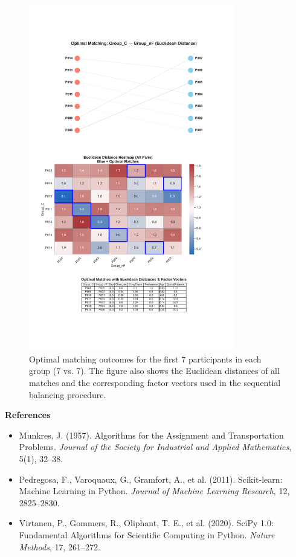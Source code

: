 \documentclass[]{imag-ms-template}
\begin{document}
\begin{figure}[h!]
\centering
\includegraphics[width=0.8\textwidth,height=0.9\textheight,keepaspectratio]{Matching_14firstparticipants.pdf}
\caption{
Optimal matching outcomes for the first 7 participants in each group (7 vs. 7).  
The figure also shows the Euclidean distances of all matches and the corresponding factor vectors used in the sequential balancing procedure.
}
\label{fig:participant_allocation_group1}
\end{figure}


\textbf{References}
\begin{itemize}
    \item Munkres, J. (1957). Algorithms for the Assignment and Transportation Problems. \textit{Journal of the Society for Industrial and Applied Mathematics}, 5(1), 32--38.
    \item Pedregosa, F., Varoquaux, G., Gramfort, A., et al. (2011). Scikit-learn: Machine Learning in Python. \textit{Journal of Machine Learning Research}, 12, 2825--2830.
    \item Virtanen, P., Gommers, R., Oliphant, T. E., et al. (2020). SciPy 1.0: Fundamental Algorithms for Scientific Computing in Python. \textit{Nature Methods}, 17, 261--272.
\end{itemize}
\end{document}
